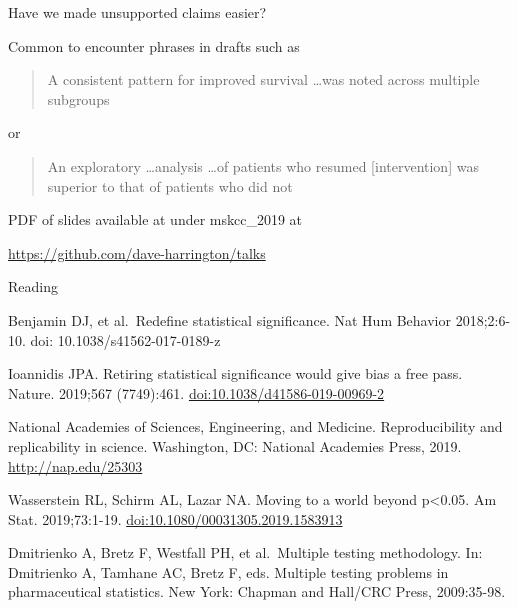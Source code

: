 \documentclass[ignorenonframetext,]{beamer}
\begin{document}
\begin{frame}{Have we made unsupported claims easier?}
\protect\hypertarget{have-we-made-unsupported-claims-easier}{}

Common to encounter phrases in drafts such as

\begin{quote} A consistent pattern for improved survival \ldots was noted across multiple subgroups
\end{quote}

or

\begin{quote}

An exploratory \ldots analysis \ldots of patients who resumed [intervention]  was superior to that of patients who did not

\end{quote}

\end{frame}

\begin{frame}

PDF of slides available at under mskcc\_2019 at

\url{https://github.com/dave-harrington/talks}

\end{frame}

\begin{frame}{Reading}
\protect\hypertarget{reading}{}

\small

Benjamin DJ, et al.~Redefine statistical significance. Nat Hum Behavior
2018;2:6-10. doi: 10.1038/s41562-017-0189-z

Ioannidis JPA. Retiring statistical significance would give bias a free
pass. Nature. 2019;567 (7749):461. \url{doi:10.1038/d41586-019-00969-2}

National Academies of Sciences, Engineering, and Medicine.
Reproducibility and replicability in science. Washington, DC: National
Academies Press, 2019. \url{http://nap.edu/25303}

Wasserstein RL, Schirm AL, Lazar NA. Moving to a world beyond
p\textless{}0.05. Am Stat. 2019;73:1-19.
\url{doi:10.1080/00031305.2019.1583913}

Dmitrienko A, Bretz F, Westfall PH, et al.~Multiple testing methodology.
In: Dmitrienko A, Tamhane AC, Bretz F, eds. Multiple testing problems in
pharmaceutical statistics. New York: Chapman and Hall/CRC Press,
2009:35-98.

\end{frame}
\end{document}
